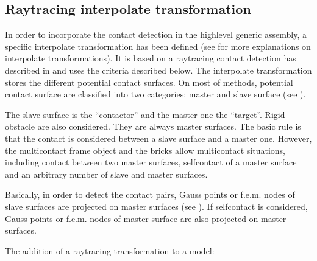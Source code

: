 \documentclass[a4paper,11pt,english]{sphinxmanual}
\begin{document}
\subsection{Raytracing interpolate transformation}
\label{\detokenize{userdoc/model_contact_friction_large_sliding:raytracing-interpolate-transformation}}\label{\detokenize{userdoc/model_contact_friction_large_sliding:ud-model-contact-friction-raytrace-inter-trans}}
In order to incorporate the contact detection in the high\sphinxhyphen{}level generic assembly, a specific interpolate transformation has been defined (see {\hyperref[\detokenize{userdoc/gasm_high:ud-gasm-high-transf}]{}} for more explanations on interpolate transformations). It is based on a raytracing contact detection has described in  and uses the criteria described below. The interpolate transformation stores the different potential contact surfaces. On most of methods, potential contact surface are classified into two categories: master and slave surface (see  {\hyperref[\detokenize{userdoc/model_contact_friction_large_sliding:ud-fig-masterslave}]{}}).

\begin{figure}[htbp]
\centering

\noindent{}
\end{figure}

The slave surface is the “contactor” and the master one the “target”. Rigid obstacle are also considered. They are always master surfaces.  The basic rule is that the contact is considered between a slave surface and a master one. However, the multi\sphinxhyphen{}contact frame object and the  bricks allow multi\sphinxhyphen{}contact situations, including contact between two master surfaces, self\sphinxhyphen{}contact of a master surface and an arbitrary number of slave and master surfaces.

Basically, in order to detect the contact pairs, Gauss points or f.e.m. nodes of slave surfaces are projected on master surfaces (see  {\hyperref[\detokenize{userdoc/model_contact_friction_large_sliding:ud-fig-masterslave}]{}}). If self\sphinxhyphen{}contact is considered, Gauss points or f.e.m. nodes of master surface are also projected on master surfaces.

The addition of a raytracing transformation to a model:
\end{document}
